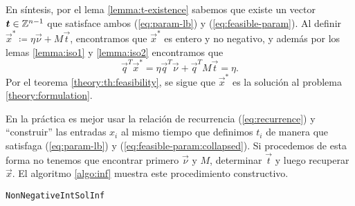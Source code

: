 En síntesis, por el lema \ref{lemma:t-existence} sabemos que existe un vector
$\boldsymbol{t} \in \mathbb{Z}^{n-1}$ que satisface ambos (\ref{eq:param-lb}) y (\ref{eq:feasible-param}).
Al definir $\vec{x}^* \coloneq \eta\vec{\nu} + M\vec{t}$, encontramos que $\vec{x}^*$ es entero y
no negativo, y además por los lemas \ref{lemma:iso1} y \ref{lemma:iso2} encontramos que
\begin{equation*}
	\vec{q}^T\vec{x}^* = \eta\vec{q}^T\vec{\nu} + \vec{q}^TM\vec{t} = \eta.
\end{equation*}
Por el teorema \ref{theory:th:feasibility}, se sigue que $\vec{x}^*$ es la solución al problema
\eqref{theory:formulation}.

En la práctica es mejor usar la relación de recurrencia (\ref{eq:recurrence}) y ``construir'' las
entradas $x_i$ al mismo tiempo que definimos $t_i$ de manera que satisfaga (\ref{eq:param-lb}) y
(\ref{eq:feasible-param:collapsed}). Si procedemos de esta forma no tenemos que encontrar primero
$\vec{\nu}$ y $M$, determinar $\vec{t}$ y luego recuperar $\vec{x}$. El algoritmo \ref{algo:inf}
muestra este procedimiento constructivo.

\begin{algorithm}[ht]
	\LinesNumbered
	\caption{\texttt{NonNegativeIntSolInf}}
	\label{algo:inf}
\end{algorithm}

